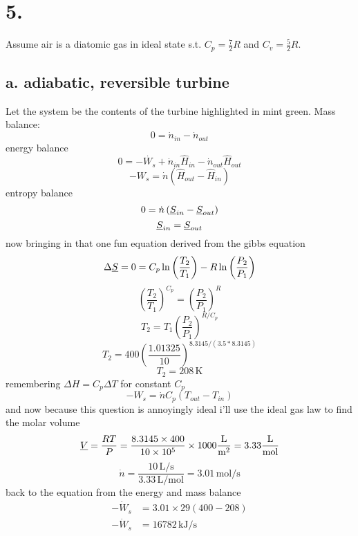 \documentclass{article}
\begin{document}
\section*{5.}
Assume air is a diatomic gas in ideal state s.t. $C_p = \frac{7}{2} R$ and $C_v = \frac{5}{2} R$. 
\subsection*{a. adiabatic, reversible turbine}
\begin{center}
\end{center}
Let the system be the contents of the turbine highlighted in mint green. Mass balance:
\[ 0 = \dot{n}_{in} - \dot{n}_{out} \]
energy balance
\[ 0 = -\dot{W_s} + \dot{n}_{in}\hat{H}_{in} - \dot{n}_{out}\hat{H}_{out} \]
\[ -W_s = \dot{n}\left(\hat{H}_{out} - \hat{H}_{in}\right) \]
entropy balance
\[ 0 = \dot{n}\left(\underbar{$S$}_{in} - \underbar{$S$}_{out}\right) \] 
\[ \underbar{$S$}_{in} = \underbar{$S$}_{out} \] 
now bringing in that one fun equation derived from the gibbs equation
\[ \Delta \underbar{$S$} = 0 = C_p \ln \left(\frac{T_2}{T_1}\right) - R \ln\left(\frac{P_2}{P_1}\right) \]
\[ \left(\frac{T_2}{T_1}\right)^{C_p} = \left(\frac{P_2}{P_1}\right)^{R} \]
\[ T_2 = T_1 \left(\frac{P_2}{P_1}\right)^{R/C_p} \]
\[ T_2 = 400 \left(\frac{1.01325}{10}\right)^{8.3145/(3.5 * 8.3145)} \]
\[ T_2 = 208\,\text{K}\]
remembering $\Delta H = C_p \Delta T$ for constant $C_p$
\[ -W_s = \dot{n}C_p\left(T_{out} - T_{in}\right) \]
and now because this question is annoyingly ideal i'll use the ideal gas law to find the molar volume
\[ \underbar{$V$} = \frac{RT}{P} = \frac{8.3145 \times 400}{10 \times 10^{5}} \times 1000\frac{\text{L}}{\text{m}^2} = 3.33 \frac{\text{L}}{\text{mol}} \]
\[ \dot{n} = \frac{10\,\text{L/s}}{3.33\,\text{L/mol}} = 3.01\,\text{mol/s} \]
back to the equation from the energy and mass balance
\begin{align*}
    -\dot{W}_s &= 3.01 \times 29 \left(400 - 208\right) \\
    -\dot{W}_s &= 16782\,\text{kJ/s}
\end{align*}
\end{document}
